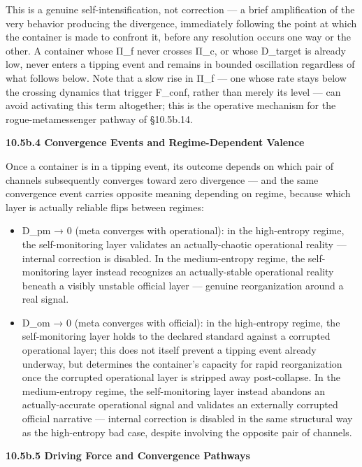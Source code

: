 \documentclass[
]{article}
\begin{document}
This is a genuine self-intensification, not correction --- a brief
amplification of the very behavior producing the divergence, immediately
following the point at which the container is made to confront it,
before any resolution occurs one way or the other. A container whose
Π\_f never crosses Π\_c, or whose D\_target is already low, never enters
a tipping event and remains in bounded oscillation regardless of what
follows below. Note that a slow rise in Π\_f --- one whose rate stays
below the crossing dynamics that trigger F\_conf, rather than merely its
level --- can avoid activating this term altogether; this is the
operative mechanism for the rogue-metamessenger pathway of §10.5b.14.

\textbf{10.5b.4 Convergence Events and Regime-Dependent Valence}

Once a container is in a tipping event, its outcome depends on which
pair of channels subsequently converges toward zero divergence --- and
the same convergence event carries opposite meaning depending on regime,
because which layer is actually reliable flips between regimes:

\begin{itemize}
\item
  D\_pm → 0 (meta converges with operational): in the high-entropy
  regime, the self-monitoring layer validates an actually-chaotic
  operational reality --- internal correction is disabled. In the
  medium-entropy regime, the self-monitoring layer instead recognizes an
  actually-stable operational reality beneath a visibly unstable
  official layer --- genuine reorganization around a real signal.
\item
  D\_om → 0 (meta converges with official): in the high-entropy regime,
  the self-monitoring layer holds to the declared standard against a
  corrupted operational layer; this does not itself prevent a tipping
  event already underway, but determines the container's capacity for
  rapid reorganization once the corrupted operational layer is stripped
  away post-collapse. In the medium-entropy regime, the self-monitoring
  layer instead abandons an actually-accurate operational signal and
  validates an externally corrupted official narrative --- internal
  correction is disabled in the same structural way as the high-entropy
  bad case, despite involving the opposite pair of channels.
\end{itemize}

\textbf{10.5b.5 Driving Force and Convergence Pathways}
\end{document}
